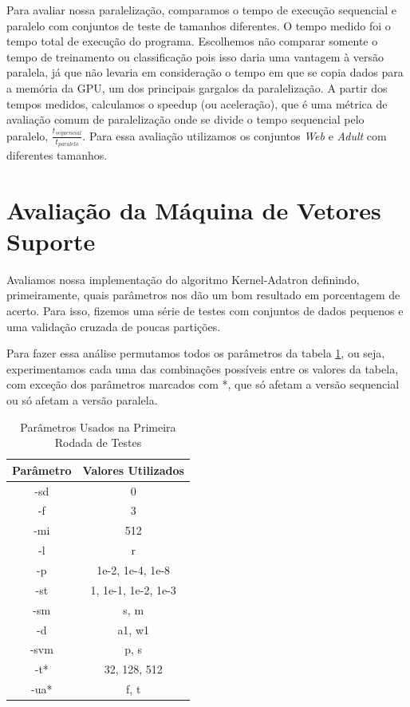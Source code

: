 Para avaliar nossa paralelização, comparamos o tempo de execução sequencial e paralelo com conjuntos de teste de tamanhos diferentes. O tempo medido foi o tempo total de execução do programa. Escolhemos não comparar somente o tempo de treinamento ou classificação pois isso daria uma vantagem à versão paralela, já que não levaria em consideração o tempo em que se copia dados para a memória da GPU, um dos principais gargalos da paralelização. A partir dos tempos medidos, calculamos o speedup (ou aceleração), que é uma métrica de avaliação comum de paralelização onde se divide o tempo sequencial pelo paralelo, $\frac{t_{sequencial}}{t_{paralelo}}$. 
Para essa avaliação utilizamos os conjuntos \emph{Web} e \emph{Adult} com diferentes tamanhos.

\section{Avaliação da Máquina de Vetores Suporte}
Avaliamos nossa implementação do algoritmo Kernel-Adatron definindo, primeiramente, quais parâmetros nos dão um bom resultado em porcentagem de acerto. Para isso, fizemos uma série de testes com conjuntos de dados pequenos e uma validação cruzada de poucas partições.

Para fazer essa análise permutamos todos os parâmetros da tabela \ref{tab:testParameters1}, ou seja, experimentamos cada uma das combinações possíveis entre os valores da tabela, com exceção dos parâmetros marcados com *, que só afetam a versão sequencial ou só afetam a versão paralela.

\begin{table}
    \caption{Parâmetros Usados na Primeira Rodada de Testes}
    \label{tab:testParameters1}
    \centering
    \begin{tabular}{|c|c|} \hline
        Parâmetro & Valores Utilizados \\ \hline
        -sd & 0 \\ \hline
        -f & 3 \\ \hline
        -mi & 512 \\ \hline
        -l & r \\ \hline
        -p & 1e-2, 1e-4, 1e-8 \\ \hline
        -st & 1, 1e-1, 1e-2, 1e-3 \\ \hline
        -sm & s, m \\ \hline
        -d & a1, w1\\ \hline
        -svm & p, s\\ \hline
        -t* & 32, 128, 512\\ \hline
        -ua* & f, t \\ \hline
    \end{tabular}
\end{table}


